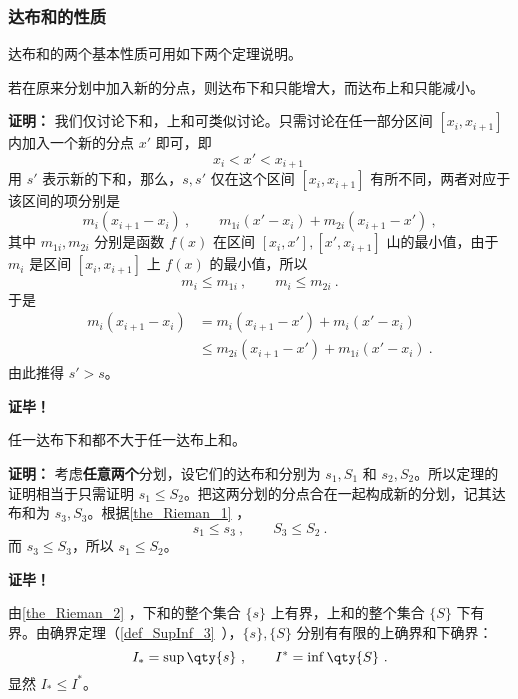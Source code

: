 \subsubsection{达布和的性质}
达布和的两个基本性质可用如下两个定理说明。
\begin{theorem}{}\label{the_Rieman_1}
若在原来分划中加入新的分点，则达布下和只能增大，而达布上和只能减小。
\end{theorem}
\textbf{证明：}
我们仅讨论下和，上和可类似讨论。只需讨论在任一部分区间 $[x_i,x_{i+1}]$ 内加入一个新的分点 $x'$ 即可，即
\begin{equation}
x_i<x'<x_{i+1}~
\end{equation}
用 $s'$ 表示新的下和，那么，$s,s'$ 仅在这个区间  $[x_i,x_{i+1}]$ 有所不同，两者对应于该区间的项分别是
\begin{equation}
m_i(x_{i+1}-x_i)~,\qquad m_{1i}(x'-x_i)+m_{2i}(x_{i+1}-x')~,
\end{equation}
其中 $m_{1i},m_{2i}$ 分别是函数 $f(x)$ 在区间 $[x_i,x'],[x',x_{i+1}]$ 山的最小值，由于 $m_i$ 是区间 $[x_i,x_{i+1}]$ 上 $f(x)$ 的最小值，所以
\begin{equation}
m_i\leq m_{1i}~,\qquad m_i\leq m_{2i}~.
\end{equation}
于是
\begin{equation}
\begin{aligned}
m_i(x_{i+1}-x_i)&=m_i(x_{i+1}-x')+m_i(x'-x_i)\\
&\leq m_{2i}(x_{i+1}-x')+m_{1i}(x'-x_i)~.
\end{aligned}
\end{equation}
由此推得 $s'>s$。

\textbf{证毕！}
\begin{theorem}{}\label{the_Rieman_2}
任一达布下和都不大于任一达布上和。
\end{theorem}
\textbf{证明：}
考虑\textbf{任意两个}分划，设它们的达布和分别为 $s_1,S_1$ 和 $s_2,S_2$。所以定理的证明相当于只需证明 $s_1\leq S_2$。把这两分划的分点合在一起构成新的分划，记其达布和为 $s_3,S_3$。根据\autoref{the_Rieman_1} ，
\begin{equation}
s_1\leq s_3~,\qquad S_3\leq S_2~.
\end{equation}
 而 $s_3\leq S_3$，所以 $s_1\leq S_2$。

\textbf{证毕！}

由\autoref{the_Rieman_2} ，下和的整个集合 $\{s\}$ 上有界，上和的整个集合 $\{S\}$ 下有界。由确界定理（\autoref{def_SupInf_3}~），$\{s\},\{S\}$ 分别有有限的上确界和下确界：
\begin{equation}
I_*=\sup\qty{s}~,\qquad I^*=\inf\qty{S}~.
\end{equation}
显然 $I_*\leq I^*$。


